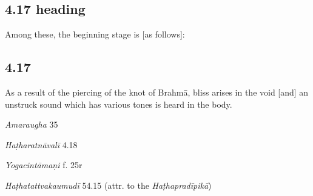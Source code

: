 \begin{ekdosis}
\subsection*{4.17 heading}
\begin{translation}[hp04_017a]
Among these, the beginning stage is [as follows]:
\end{translation}


\subsection*{4.17}
\begin{translation}[hp04_017]
As a result of the piercing of the knot of Brahmā, bliss arises in the void [and] an unstruck sound which has various tones is heard in the body.
\end{translation}


\begin{sources}[hp04_017]
\emph{Amaraugha} 35
\begin{versinnote}
\end{versinnote}
\end{sources}

\begin{testimonia}[hp04_017]
\emph{Haṭharatnāvalī} 4.18
\begin{versinnote}
\tl{\var{yo nādaḥ ] ānandaḥ \vl}\\+}
\tl{\var{vicitrakvaṇado ] vicitrakvaṇako \vl}\\!}
\end{versinnote}

\emph{Yogacintāmaṇi} f. 25r
\begin{versinnote}
\end{versinnote}

\emph{Haṭhatattvakaumudī} 54.15 (attr. to the \emph{Haṭhapradīpikā})
\begin{versinnote}
\end{versinnote}
\end{testimonia}


\end{ekdosis}
